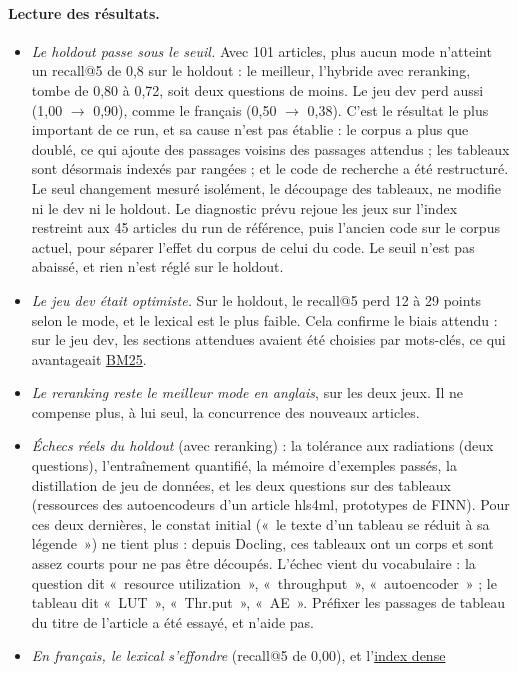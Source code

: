\documentclass[11pt,a4paper]{article}
\newcommand{\gl}[2]{\hyperlink{gl:#1}{\textcolor{glcolor}{#2}}}
\begin{document}
\paragraph{Lecture des résultats.}
\begin{itemize}
  \item \emph{Le holdout passe sous le seuil.} Avec 101 articles, plus aucun mode n'atteint
    un recall@5 de 0,8 sur le holdout : le meilleur, l'hybride avec reranking, tombe de 0,80
    à 0,72, soit deux questions de moins. Le jeu dev perd aussi (1,00 $\rightarrow$ 0,90),
    comme le français (0,50 $\rightarrow$ 0,38). C'est le résultat le plus important de ce
    run, et sa cause n'est pas établie : le corpus a plus que doublé, ce qui ajoute des
    passages voisins des passages attendus ; les tableaux sont désormais indexés par
    rangées ; et le code de recherche a été restructuré. Le seul changement mesuré isolément,
    le découpage des tableaux, ne modifie ni le dev ni le holdout. Le diagnostic prévu rejoue
    les jeux sur l'index restreint aux 45 articles du run de référence, puis l'ancien code sur
    le corpus actuel, pour séparer l'effet du corpus de celui du code. Le seuil n'est pas
    abaissé, et rien n'est réglé sur le holdout.
  \item \emph{Le jeu dev était optimiste.} Sur le holdout, le recall@5 perd 12 à 29 points
    selon le mode, et le lexical est le plus faible. Cela confirme le biais attendu : sur le jeu dev, les sections attendues
    avaient été choisies par mots-clés, ce qui avantageait \gl{BM25}{BM25}.
  \item \emph{Le reranking reste le meilleur mode en anglais}, sur les deux jeux. Il ne
    compense plus, à lui seul, la concurrence des nouveaux articles.
  \item \emph{Échecs réels du holdout} (avec reranking) : la tolérance aux radiations (deux
    questions), l'entraînement quantifié, la mémoire
    d'exemples passés, la distillation de jeu de données, et les deux questions sur des
    tableaux (ressources des autoencodeurs d'un article hls4ml, prototypes de FINN). Pour ces
    deux dernières, le constat initial («~le texte d'un tableau se réduit à sa légende~») ne
    tient plus : depuis Docling, ces tableaux ont un corps et sont assez courts pour ne pas
    être découpés. L'échec vient du vocabulaire : la question dit «~resource utilization~»,
    «~throughput~», «~autoencoder~» ; le tableau dit «~LUT~», «~Thr.put~», «~AE~». Préfixer
    les passages de tableau du titre de l'article a été essayé, et n'aide pas.
  \item \emph{En français, le lexical s'effondre} (recall@5 de 0,00), et l'\gl{index}{index dense}

\end{itemize}
\end{document}
